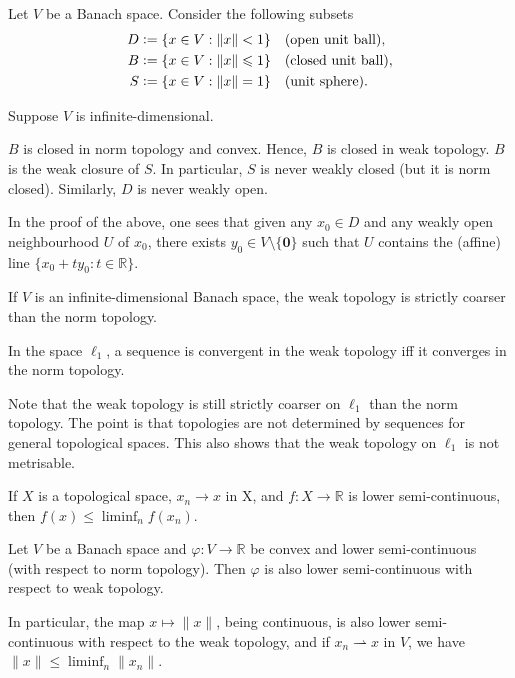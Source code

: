 \documentclass[12pt]{article}	%
\newcommand{\weak}{\rightharpoonup}
\begin{document}
\begin{prop}
	Let $V$ be a Banach space. Consider the following subsets
	\begin{align*} 
		D &\vcentcolon= \{x \in V : \|x\| < 1\} \quad \text{(open unit ball)}, \\
		B &\vcentcolon= \{x \in V : \|x\| \le 1\} \quad \text{(closed unit ball)}, \\
		S &\vcentcolon= \{x \in V : \|x\| = 1\} \quad \text{(unit sphere)}.
	\end{align*}

	Suppose $V$ is infinite-dimensional.

	$B$ is closed in norm topology and convex. Hence, $B$ is closed in weak topology. \newline
	$B$ is the weak closure of $S$. In particular, $S$ is never weakly closed (but it is norm closed). \newline
	Similarly, $D$ is never weakly open. 
\end{prop}
In the proof of the above, one sees that given any $x_{0} \in D$ and any weakly open neighbourhood $U$ of $x_{0}$, there exists $y_{0} \in V \setminus \{\mathbf{0}\}$ such that $U$ contains the (affine) line $\{x_{0} + t y_{0} : t \in \mathbb{R}\}$.

\begin{cor}
	If $V$ is an infinite-dimensional Banach space, the weak topology is strictly coarser than the norm topology.
\end{cor}

\begin{thm}
	In the space $\ell_{1}$, a sequence is convergent in the weak topology iff it converges in the norm topology.
\end{thm}
\begin{obs}
	Note that the weak topology is still strictly coarser on $\ell_{1}$ than the norm topology. The point is that topologies are not determined by sequences for general topological spaces. This also shows that the weak topology on $\ell_{1}$ is not metrisable.
\end{obs}

\begin{prop}
	If $X$ is a topological space, $x_{n} \to x$ in X, and $f : X \to \mathbb{R}$ is lower semi-continuous, then $f(x) \le \liminf_{n} f(x_{n})$.
\end{prop}

\begin{cor}
	Let $V$ be a Banach space and $\varphi : V \to \mathbb{R}$ be convex and lower semi-continuous (with respect to norm topology). Then $\varphi$ is also lower semi-continuous with respect to weak topology.	

	In particular, the map $x \mapsto \|x\|$, being continuous, is also lower semi-continuous with respect to the weak topology, and if $x_{n} \weak x$ in $V$, we have $\|x\| \le \liminf_{n} \|x_{n}\|$.	
\end{cor}
\end{document}
